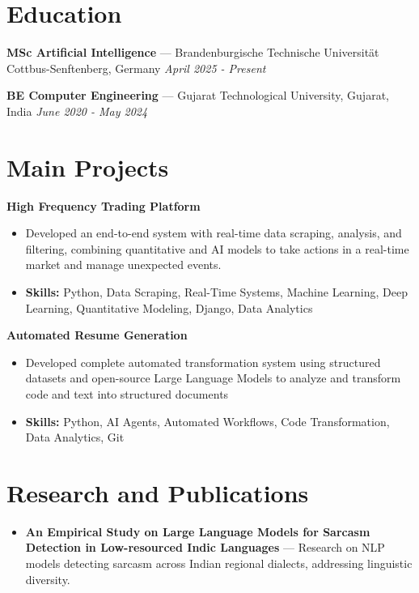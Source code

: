 \documentclass[a4paper,10pt]{article}
\begin{document}
\section*{Education}
\textbf{MSc Artificial Intelligence} — Brandenburgische Technische Universität Cottbus-Senftenberg, Germany \hfill \textit{April 2025 - Present}\par
\vspace{1.5pt}
\textbf{BE Computer Engineering} — Gujarat Technological University, Gujarat, India \hfill \textit{June 2020 - May 2024}\par

\section*{Main Projects}
\textbf{High Frequency Trading Platform}\par
\vspace{1pt}
\begin{itemize}
  \item Developed an end-to-end system with real-time data scraping, analysis, and filtering, combining quantitative and AI models to take actions in a real-time market and manage unexpected events.
  \item \textbf{Skills:} Python, Data Scraping, Real-Time Systems, Machine Learning, Deep Learning, Quantitative Modeling, Django, Data Analytics
\end{itemize}
\vspace{3pt}
\textbf{Automated Resume Generation}\par
\vspace{1pt}
\begin{itemize}
  \item Developed complete automated transformation system using structured datasets and open-source Large Language Models to analyze and transform code and text into structured documents
  \item \textbf{Skills:} Python, AI Agents, Automated Workflows, Code Transformation, Data Analytics, Git
\end{itemize}

\section*{Research and Publications}
\begin{itemize}
\item \textbf{An Empirical Study on Large Language Models for Sarcasm Detection in Low-resourced Indic Languages} — Research on NLP models detecting sarcasm across Indian regional dialects, addressing linguistic diversity.
\end{itemize}
\end{document}

